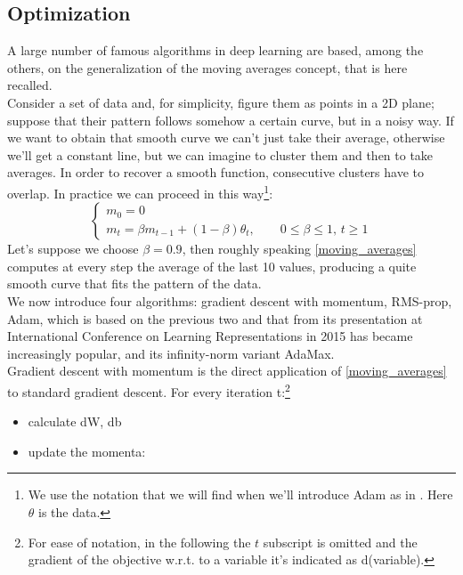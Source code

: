 \documentclass[12pt, a4paper]{report}
\theoremstyle{definition}
\begin{document}
{\subsection{Optimization}\label{par1.2.2}
A large number of famous algorithms  in deep learning are based, among the others, on the generalization of the moving averages concept, that is here recalled.\\
Consider a set of data and, for simplicity, figure them as points in a 2D plane; suppose that their pattern follows somehow a certain curve, but in a noisy way. If we want to obtain that smooth curve we can't just take their average, otherwise we'll get a constant line, but we can imagine to cluster them and then to take averages. In order to recover a smooth function, consecutive clusters have to overlap. In practice we can proceed in this way\footnote{We use the notation that we will find when we'll introduce Adam as in \cite{Kingma}. Here $\theta$ is the data. }:
\begin{equation}\label{moving_averages}
\begin{cases}
m_0=0\\
m_t=\beta m_{t-1} + (1-\beta) \theta_t, \quad\quad 0\le\beta\le 1, \, t\geq 1
\end{cases}
\end{equation}
Let's suppose we choose $\beta=0.9$, then roughly speaking \eqref{moving_averages}  computes at every step the average of the last 10 values, producing a quite smooth curve that fits the pattern of the data.\\
\newline \noindent We now introduce four algorithms: gradient descent with momentum, RMS-prop, Adam, which is based on the previous two and that from its presentation at International Conference on Learning Representations in 2015 has became increasingly popular, and its infinity-norm variant AdaMax.\\
\newline \noindent Gradient descent with momentum is the direct application of \eqref{moving_averages} to standard gradient descent. For every iteration t:\footnote{For ease of notation, in the following the $t$ subscript is omitted and the gradient of the objective w.r.t. to a variable it's indicated as d(variable). }
\begin{itemize}\label{momentum}
	\item calculate dW, db
	\item update the momenta: 
	\begin{equation}

\end{equation}
\end{itemize}}
\end{document}
